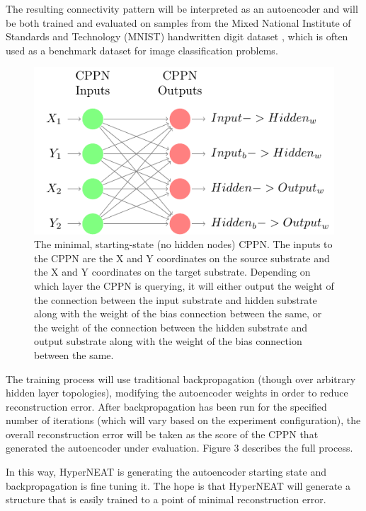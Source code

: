 \documentclass{acm_proc_article-sp}
\begin{document}
The resulting connectivity pattern will be interpreted as an autoencoder and will be both trained and evaluated on samples from the Mixed National Institute of Standards and Technology (MNIST) handwritten digit dataset \cite{mnistdataset}, which is often used as a benchmark dataset for image classification problems.

\begin{figure}[h]
\caption{The minimal, starting-state (no hidden nodes) CPPN.  The inputs to the CPPN are the X and Y coordinates on the source substrate and the X and Y coordinates on the target substrate.  Depending on which layer the CPPN is querying, it will either output the weight of the connection between the input substrate and hidden substrate along with the weight of the bias connection between the same, or the weight of the connection between the hidden substrate and output substrate along with the weight of the bias connection between the same.}
\centering
\includegraphics[scale=0.8]{MinimalCppn/MinimalCppn}
\end{figure}

The training process will use traditional backpropagation (though over arbitrary hidden layer topologies), modifying the autoencoder weights in order to reduce reconstruction error.  After backpropagation has been run for the specified number of iterations (which will vary based on the experiment configuration), the overall reconstruction error will be taken as the score of the CPPN that generated the autoencoder under evaluation.  Figure 3 describes the full process.

In this way, HyperNEAT is generating the autoencoder starting state and backpropagation is fine tuning it.  The hope is that HyperNEAT will generate a structure that is easily trained to a point of minimal reconstruction error.
\end{document}
